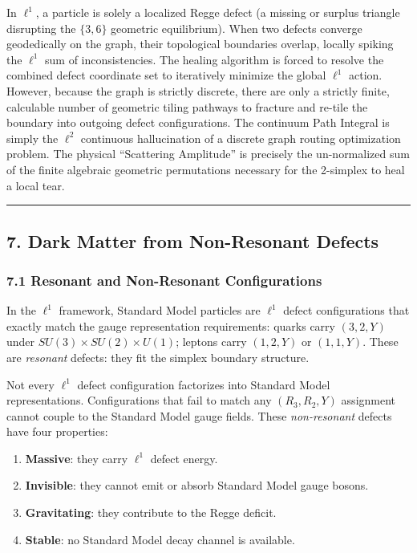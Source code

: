 \documentclass[
]{article}
\providecommand{\tightlist}{%
  \setlength{\itemsep}{0pt}\setlength{\parskip}{0pt}}
\begin{document}
In \(\ell^1\), a particle is solely a localized Regge defect (a missing
or surplus triangle disrupting the \(\{3,6\}\) geometric equilibrium).
When two defects converge geodedically on the graph, their topological
boundaries overlap, locally spiking the \(\ell^1\) sum of
inconsistencies. The healing algorithm is forced to resolve the combined
defect coordinate set to iteratively minimize the global \(\ell^1\)
action. However, because the graph is strictly discrete, there are only
a strictly finite, calculable number of geometric tiling pathways to
fracture and re-tile the boundary into outgoing defect configurations.
The continuum Path Integral is simply the \(\ell^2\) continuous
hallucination of a discrete graph routing optimization problem. The
physical ``Scattering Amplitude'' is precisely the un-normalized sum of
the finite algebraic geometric permutations necessary for the 2-simplex
to heal a local tear.

\begin{center}\rule{0.5\linewidth}{0.5pt}\end{center}

\subsection{7. Dark Matter from Non-Resonant
Defects}\label{dark-matter-from-non-resonant-defects}

\subsubsection{7.1 Resonant and Non-Resonant
Configurations}\label{resonant-and-non-resonant-configurations}

In the \(\ell^1\) framework, Standard Model particles are \(\ell^1\)
defect configurations that exactly match the gauge representation
requirements: quarks carry \((3, 2, Y)\) under
\(SU(3) \times SU(2) \times U(1)\); leptons carry \((1, 2, Y)\) or
\((1, 1, Y)\). These are \emph{resonant} defects: they fit the simplex
boundary structure.

Not every \(\ell^1\) defect configuration factorizes into Standard Model
representations. Configurations that fail to match any \((R_3, R_2, Y)\)
assignment cannot couple to the Standard Model gauge fields. These
\emph{non-resonant} defects have four properties:

\begin{enumerate}
\def\labelenumi{\arabic{enumi}.}
\tightlist
\item
  \textbf{Massive}: they carry \(\ell^1\) defect energy.
\item
  \textbf{Invisible}: they cannot emit or absorb Standard Model gauge
  bosons.
\item
  \textbf{Gravitating}: they contribute to the Regge deficit.
\item
  \textbf{Stable}: no Standard Model decay channel is available.
\end{enumerate}
\end{document}
